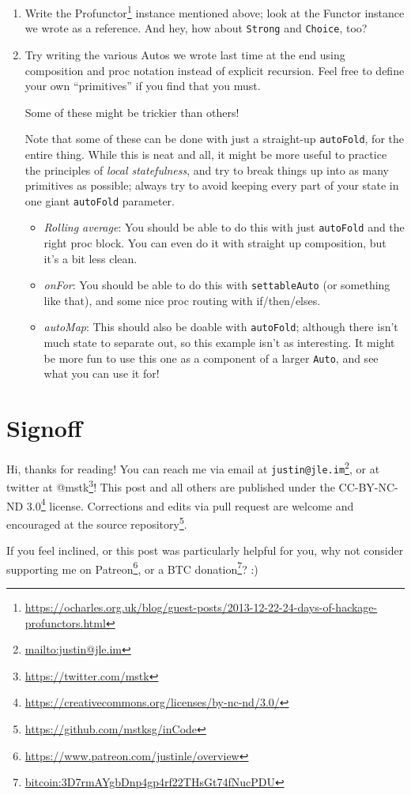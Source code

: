 \documentclass[]{article}
\renewcommand{\href}[2]{#2\footnote{\url{#1}}}
\begin{document}
\begin{enumerate}
\def\labelenumi{\arabic{enumi}.}
\item
  Write the
  \href{https://ocharles.org.uk/blog/guest-posts/2013-12-22-24-days-of-hackage-profunctors.html}{Profunctor}
  instance mentioned above; look at the Functor instance we wrote as a
  reference. And hey, how about \texttt{Strong} and \texttt{Choice}, too?
\item
  Try writing the various Autos we wrote last time at the end using composition
  and proc notation instead of explicit recursion. Feel free to define your own
  ``primitives'' if you find that you must.

  Some of these might be trickier than others!

  Note that some of these can be done with just a straight-up \texttt{autoFold},
  for the entire thing. While this is neat and all, it might be more useful to
  practice the principles of \emph{local statefulness}, and try to break things
  up into as many primitives as possible; always try to avoid keeping every part
  of your state in one giant \texttt{autoFold} parameter.

  \begin{itemize}
  \item
    \emph{Rolling average}: You should be able to do this with just
    \texttt{autoFold} and the right proc block. You can even do it with straight
    up composition, but it's a bit less clean.
  \item
    \emph{onFor}: You should be able to do this with \texttt{settableAuto} (or
    something like that), and some nice proc routing with if/then/elses.
  \item
    \emph{autoMap}: This should also be doable with \texttt{autoFold}; although
    there isn't much state to separate out, so this example isn't as
    interesting. It might be more fun to use this one as a component of a larger
    \texttt{Auto}, and see what you can use it for!
  \end{itemize}
\end{enumerate}

\section{Signoff}\label{signoff}

Hi, thanks for reading! You can reach me via email at
\href{mailto:justin@jle.im}{\nolinkurl{justin@jle.im}}, or at twitter at
\href{https://twitter.com/mstk}{@mstk}! This post and all others are published
under the \href{https://creativecommons.org/licenses/by-nc-nd/3.0/}{CC-BY-NC-ND
3.0} license. Corrections and edits via pull request are welcome and encouraged
at \href{https://github.com/mstksg/inCode}{the source repository}.

If you feel inclined, or this post was particularly helpful for you, why not
consider \href{https://www.patreon.com/justinle/overview}{supporting me on
Patreon}, or a \href{bitcoin:3D7rmAYgbDnp4gp4rf22THsGt74fNucPDU}{BTC donation}?
:)
\end{document}
